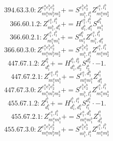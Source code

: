 \documentclass[letterpaper,10pt,fleqn,leqno,onecolumn]{article}
\begin{document}
\begin{equation} \;\;\;\;\;\;  394.63.3.0: Z^{e_{1}^{a}e_{1}^{b}e_{2}^{b}}_{m_{1}^{a}m_{1}^{b}m_{2}^{b}}+=S^{e_{1}^{b}e_{2}^{b}}_{m_{1}^{b},l_{1}^{b}}Z^{e_{1}^{a},l_{1}^{b}}_{m_{1}^{a}m_{2}^{b}} \end{equation}
\begin{equation} \;\;\;\;\;\;  366.60.1.2: Z^{e_{1}^{a},l_{1}^{b}}_{m_{1}^{b},d_{1}^{a}}+=H^{e_{1}^{a},l_{1}^{b}}_{d_{1}^{b},d_{1}^{a}}S^{d_{1}^{b}}_{m_{1}^{b}} \end{equation}
\begin{equation} \;\;\;\;\;\;  366.60.2.1: Z^{e_{1}^{a},l_{1}^{b}}_{m_{1}^{a}m_{1}^{b}}+=S^{d_{1}^{a}}_{m_{1}^{a}}Z^{e_{1}^{a},l_{1}^{b}}_{m_{1}^{b},d_{1}^{a}} \end{equation}
\begin{equation} \;\;\;\;\;\;  366.60.3.0: Z^{e_{1}^{a}e_{1}^{b}e_{2}^{b}}_{m_{1}^{a}m_{1}^{b}m_{2}^{b}}+=S^{e_{1}^{b}e_{2}^{b}}_{m_{1}^{b},l_{1}^{b}}Z^{e_{1}^{a},l_{1}^{b}}_{m_{1}^{a}m_{2}^{b}} \end{equation}
\begin{equation} \;\;\;\;\;\;  447.67.1.2: Z^{l_{1}^{b}}_{d_{1}^{b}}+=H^{l_{1}^{b},l_{2}^{b}}_{d_{1}^{b},d_{2}^{b}}S^{d_{2}^{b}}_{l_{2}^{b}}\cdot -1. \end{equation}
\begin{equation} \;\;\;\;\;\;  447.67.2.1: Z^{e_{1}^{a},l_{1}^{b}}_{m_{1}^{a}m_{1}^{b}}+=S^{e_{1}^{a},d_{1}^{b}}_{m_{1}^{a}m_{1}^{b}}Z^{l_{1}^{b}}_{d_{1}^{b}} \end{equation}
\begin{equation} \;\;\;\;\;\;  447.67.3.0: Z^{e_{1}^{a}e_{1}^{b}e_{2}^{b}}_{m_{1}^{a}m_{1}^{b}m_{2}^{b}}+=S^{e_{1}^{b}e_{2}^{b}}_{m_{1}^{b},l_{1}^{b}}Z^{e_{1}^{a},l_{1}^{b}}_{m_{1}^{a}m_{2}^{b}} \end{equation}
\begin{equation} \;\;\;\;\;\;  455.67.1.2: Z^{l_{1}^{b}}_{d_{1}^{b}}+=H^{l_{1}^{b},l_{1}^{a}}_{d_{1}^{b},d_{1}^{a}}S^{d_{1}^{a}}_{l_{1}^{a}}\cdot -1. \end{equation}
\begin{equation} \;\;\;\;\;\;  455.67.2.1: Z^{e_{1}^{a},l_{1}^{b}}_{m_{1}^{a}m_{1}^{b}}+=S^{e_{1}^{a},d_{1}^{b}}_{m_{1}^{a}m_{1}^{b}}Z^{l_{1}^{b}}_{d_{1}^{b}} \end{equation}
\begin{equation} \;\;\;\;\;\;  455.67.3.0: Z^{e_{1}^{a}e_{1}^{b}e_{2}^{b}}_{m_{1}^{a}m_{1}^{b}m_{2}^{b}}+=S^{e_{1}^{b}e_{2}^{b}}_{m_{1}^{b},l_{1}^{b}}Z^{e_{1}^{a},l_{1}^{b}}_{m_{1}^{a}m_{2}^{b}} \end{equation}
\end{document}
